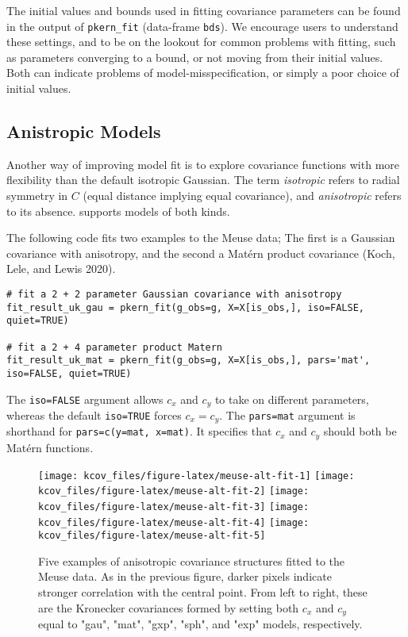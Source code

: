 The initial values and bounds used in fitting covariance parameters can be found in the output of \texttt{pkern\_fit} (data-frame \texttt{bds}). We encourage users to understand these settings, and to be on the lookout for common problems with fitting, such as parameters converging to a bound, or not moving from their initial values. Both can indicate problems of model-misspecification, or simply a poor choice of initial values.

\hypertarget{anistropic-models}{%
\subsection{Anistropic Models}\label{anistropic-models}}

Another way of improving model fit is to explore covariance functions with more flexibility than the default isotropic Gaussian. The term \emph{isotropic} refers to radial symmetry in \(C\) (equal distance implying equal covariance), and \emph{anisotropic} refers to its absence.  supports models of both kinds.

The following code fits two examples to the Meuse data; The first is a Gaussian covariance with anisotropy, and the second a Matérn product covariance (Koch, Lele, and Lewis 2020).

\begin{verbatim}
# fit a 2 + 2 parameter Gaussian covariance with anisotropy
fit_result_uk_gau = pkern_fit(g_obs=g, X=X[is_obs,], iso=FALSE, quiet=TRUE)

# fit a 2 + 4 parameter product Matern
fit_result_uk_mat = pkern_fit(g_obs=g, X=X[is_obs,], pars='mat', iso=FALSE, quiet=TRUE)
\end{verbatim}

The \texttt{iso=FALSE} argument allows \(c_x\) and \(c_y\) to take on different parameters, whereas the default \texttt{iso=TRUE} forces \(c_x=c_y\). The \texttt{pars=\textquotesingle{}mat\textquotesingle{}} argument is shorthand for \texttt{pars=c(y=\textquotesingle{}mat\textquotesingle{},\ x=\textquotesingle{}mat\textquotesingle{})}. It specifies that \(c_x\) and \(c_y\) should both be Matérn functions.

\begin{figure}[!htb]
\texttt{[image: kcov\_files/figure-latex/meuse-alt-fit-1]} \texttt{[image: kcov\_files/figure-latex/meuse-alt-fit-2]} \texttt{[image: kcov\_files/figure-latex/meuse-alt-fit-3]} \texttt{[image: kcov\_files/figure-latex/meuse-alt-fit-4]} \texttt{[image: kcov\_files/figure-latex/meuse-alt-fit-5]} \caption{Five examples of anisotropic covariance structures fitted to the Meuse data. As in the previous figure, darker pixels indicate stronger correlation with the central point. From left to right, these are the Kronecker covariances formed by setting both $c_x$ and $c_y$ equal to "gau", "mat", "gxp", "sph", and "exp" models, respectively.}\label{fig:meuse-alt-fit}
\end{figure}

